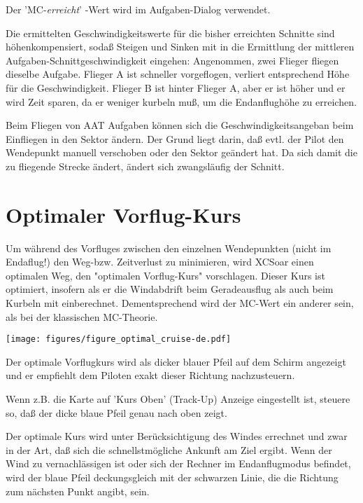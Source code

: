Der 'MC-\emph{erreicht}' -Wert wird im Aufgaben-Dialog verwendet.

Die ermittelten Geschwindigkeitswerte für die bisher erreichten Schnitte sind höhenkompensiert,
sodaß Steigen und Sinken mit in die Ermittlung der mittleren Aufgaben-Schnittgeschwindigkeit eingehen:
Angenommen, zwei Flieger fliegen dieselbe Aufgabe.
Flieger A ist schneller vorgeflogen, verliert entsprechend Höhe für die Geschwindigkeit.
Flieger B ist hinter Flieger A, aber er ist höher und er wird Zeit sparen, da er weniger kurbeln muß, um
die Endanflughöhe zu erreichen.

Beim Fliegen von AAT Aufgaben können sich die Geschwindigkeitsangeban beim Einfliegen in
den Sektor ändern. Der Grund liegt darin,  daß evtl. der Pilot den Wendepunkt manuell
verschoben  oder den Sektor geändert hat. Da sich damit die zu fliegende Strecke ändert,
ändert sich zwangsläufig der Schnitt.


\section{Optimaler Vorflug-Kurs}

Um während des Vorfluges zwischen den einzelnen Wendepunkten (nicht im Endaflug!) den Weg-bzw.
Zeitverlust zu minimieren, wird \textsf{XCSoar} einen optimalen Weg, den "optimalen Vorflug-Kurs"
vorschlagen. Dieser Kurs ist optimiert, insofern als er die Windabdrift beim Geradeausflug als auch beim
Kurbeln mit einberechnet. Dementsprechend wird der MC-Wert ein anderer sein, als bei der klassischen
MC-Theorie.


\begin{center}
\begin{maxipage}
\centering
\def\svgwidth{0.8\linewidth}
\texttt{[image: figures/figure\_optimal\_cruise-de.pdf]}
\end{maxipage}
\end{center}

Der optimale Vorflugkurs wird als dicker blauer Pfeil auf dem Schirm angezeigt und er empfiehlt dem Piloten
exakt dieser Richtung nachzusteuern.

Wenn z.B. die Karte auf 'Kurs Oben'  (Track-Up) Anzeige eingestellt ist, steuere so, daß der dicke blaue Pfeil
genau nach oben zeigt.

Der optimale Kurs wird unter Berücksichtigung des Windes errechnet und zwar in der Art, daß sich die
schnellstmögliche Ankunft am Ziel ergibt. Wenn der Wind zu vernachlässigen ist oder sich der Rechner im
Endanflugmodus befindet, wird der blaue
Pfeil deckungsgleich mit der schwarzen Linie, die die Richtung zum nächsten Punkt angibt, sein.


